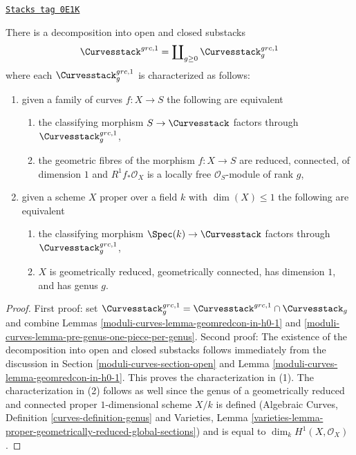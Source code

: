 \begin{lemma}
\label{moduli-curves-lemma-one-piece-per-genus}
\href{https://stacks.math.columbia.edu/tag/0E1K}{\texttt{Stacks tag 0E1K}}

There is a decomposition into open and closed substacks
$$
\Curvesstack^{grc, 1} = \coprod\nolimits_{g \geq 0} \Curvesstack^{grc, 1}_g
$$
where each $\Curvesstack^{grc, 1}_g$ is characterized as follows:
\begin{enumerate}
\item given a family of curves $f : X \to S$ the following are equivalent
\begin{enumerate}
\item the classifying morphism $S \to \Curvesstack$ factors
through $\Curvesstack^{grc, 1}_g$,
\item the geometric fibres of the morphism $f : X \to S$ are
reduced, connected, of dimension $1$ and
$R^1f_*\mathcal{O}_X$ is a locally free $\mathcal{O}_S$-module
of rank $g$,
\end{enumerate}
\item given a scheme $X$ proper over a field $k$ with $\dim(X) \leq 1$
the following are equivalent
\begin{enumerate}
\item the classifying morphism $\Spec(k) \to \Curvesstack$ factors
through $\Curvesstack^{grc, 1}_g$,
\item $X$ is geometrically reduced, geometrically connected,
has dimension $1$, and has genus $g$.
\end{enumerate}
\end{enumerate}
\end{lemma}

\begin{proof}
First proof: set
$\Curvesstack^{grc, 1}_g = \Curvesstack^{grc, 1} \cap \Curvesstack_g$
and combine Lemmas \ref{moduli-curves-lemma-geomredcon-in-h0-1} and
\ref{moduli-curves-lemma-pre-genus-one-piece-per-genus}.
Second proof:
The existence of the decomposition into open and closed substacks
follows immediately from the discussion in Section \ref{moduli-curves-section-open}
and Lemma \ref{moduli-curves-lemma-geomredcon-in-h0-1}.
This proves the characterization in (1).
The characterization in (2) follows as well since
the genus of a geometrically reduced and connected
proper $1$-dimensional scheme $X/k$ is defined
(Algebraic Curves, Definition \ref{curves-definition-genus} and
Varieties, Lemma
\ref{varieties-lemma-proper-geometrically-reduced-global-sections})
and is equal to $\dim_k H^1(X, \mathcal{O}_X)$.
\end{proof}

